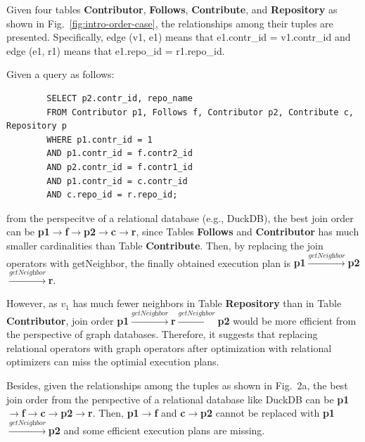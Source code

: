 \begin{example}
    Given four tables \textbf{Contributor}, \textbf{Follows}, \textbf{Contribute}, and \textbf{Repository} as shown in Fig.~\ref{fig:intro-order-case}, the relationships among their tuples are presented.
    Specifically, edge (v1, e1) means that e1.contr\_id = v1.contr\_id and edge (e1, r1) means that e1.repo\_id = r1.repo\_id.

    Given a query as follows:
    \begin{lstlisting}
        SELECT p2.contr_id, repo_name
        FROM Contributor p1, Follows f, Contributor p2, Contribute c, Repository p
        WHERE p1.contr_id = 1 
        AND p1.contr_id = f.contr2_id 
        AND p2.contr_id = f.contr1_id
        AND p1.contr_id = c.contr_id 
        AND c.repo_id = r.repo_id;
    \end{lstlisting}
    from the perspecitve of a relational database (e.g., DuckDB), the best join order can be \textbf{p1$\rightarrow$f$\rightarrow$p2$\rightarrow$c$\rightarrow$r}, since Tables \textbf{Follows} and \textbf{Contributor} has much smaller cardinalities than Table \textbf{Contribute}.
    Then, by replacing the join operators with getNeighbor, the finally obtained execution plan is \textbf{p1$\xrightarrow{\textit{getNeighbor}}$p2$\xrightarrow{\textit{getNeighbor}}$r}.

    However, as $v_1$ has much fewer neighbors in Table \textbf{Repository} than in Table \textbf{Contributor}, join order \textbf{p1$\xrightarrow{\textit{getNeighbor}}$r$\xrightarrow{\textit{getNeighbor}}$p2} would be more efficient from the perspective of graph databases.
    Therefore, it suggests that replacing relational operators with graph operators after optimization with relational optimizers can miss the optimial execution plans.

    Besides, given the relationships among the tuples as shown in Fig.~2a, the best join order from the perspective of a relational database like DuckDB can be \textbf{p1$\rightarrow$f$\rightarrow$c$\rightarrow$p2$\rightarrow$r}.
    Then, \textbf{p1$\rightarrow$f} and \textbf{c$\rightarrow$p2} cannot be replaced with \textbf{p1$\xrightarrow{\textit{getNeighbor}}$p2} and some efficient execution plans are missing.

\end{example}


